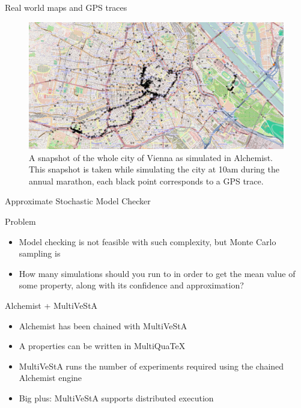 \documentclass[presentation]{beamer}\mode<presentation>{\usetheme{sapere}}
\begin{document}
\begin{frame}{Real world maps and GPS traces}
  \begin{figure}
    \includegraphics[width=\textwidth]{imgs/vienna}
    \caption{A snapshot of the whole city of Vienna as simulated in Alchemist. This snapshot is taken while simulating the city at 10am during the annual marathon, each black point corresponds to a GPS trace.}
    \label{img:vienna}
  \end{figure}
\end{frame}

\begin{frame}{Approximate Stochastic Model Checker}
\begin{block}{Problem}
 \begin{itemize}
  \item Model checking is not feasible with such complexity, but Monte Carlo sampling is
  \item How many simulations should you run to in order to get the mean value of some property, along with its confidence and approximation?
 \end{itemize}
\end{block}
\begin{block}{Alchemist + MultiVeStA}
 \begin{itemize}
  \item Alchemist has been chained with MultiVeStA
  \item A properties can be written in MultiQuaTeX
  \item MultiVeStA runs the number of experiments required using the chained Alchemist engine
  \item Big plus: MultiVeStA supports distributed execution
 \end{itemize}
\end{block}
\end{frame}
\end{document}
